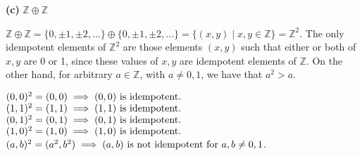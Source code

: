 \textbf{(c)} $\mathbb{Z} \oplus \mathbb{Z}$

\vspace{5 mm}
$\mathbb{Z} \oplus \mathbb{Z} = \{0,\pm1,\pm2,...\} \oplus \{0,\pm1,\pm2,...\} = \{(x,y) \mid x,y \in \mathbb{Z}\} = \mathbb{Z}^2$. The only idempotent elements of $\mathbb{Z}^2$ are those elements $(x,y)$ such that either or both of $x,y$ are 0 or 1, since these values of $x,y$ are idempotent elements of $\mathbb{Z}$. On the other hand, for arbitrary $a \in \mathbb{Z}$, with $a \ne 0,1$, we have that $a^2 > a$.

$(0,0)^2 = (0,0) \implies (0,0) \textnormal{ is idempotent.}$ \\
$(1,1)^2 = (1,1) \implies (1,1) \textnormal{ is idempotent.}$ \\
$(0,1)^2 = (0,1) \implies (0,1) \textnormal{ is idempotent.}$ \\
$(1,0)^2 = (1,0) \implies (1,0) \textnormal{ is idempotent.}$ \\
$(a,b)^2 = (a^2,b^2) \implies (a,b) \textnormal{ is not idempotent for } a,b \ne 0,1$.